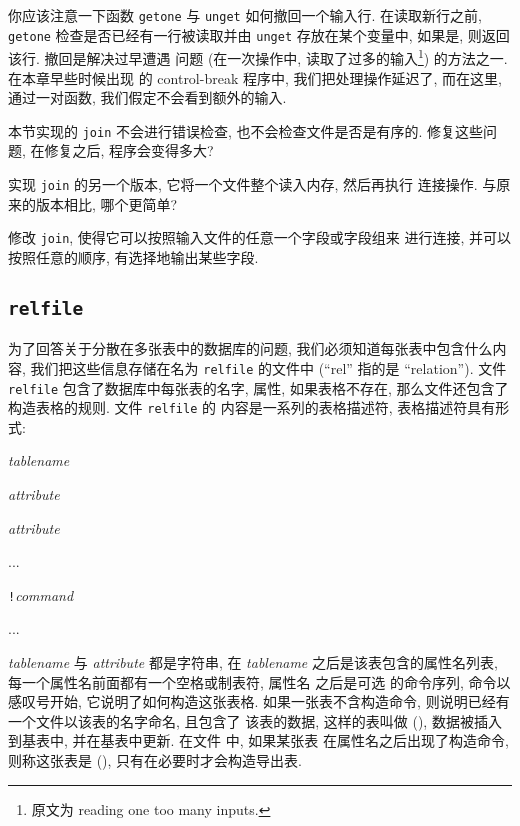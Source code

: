 你应该注意一下函数 \texttt{getone} 与 \texttt{unget} 如何撤回一个输入行.
在读取新行之前, \texttt{getone} 检查是否已经有一行被读取并由
\texttt{unget} 存放在某个变量中, 如果是, 则返回该行. 撤回是解决过早遭遇
问题 (在一次操作中, 读取了过多的输入\footnote{原文为 reading one too 
many inputs.}) 的方法之一.
在本章早些时候出现 的 control-break 程序中, 我们把处理操作延迟了, 而在这里,
通过一对函数, 我们假定不会看到额外的输入.

\begin{exercise}
    本节实现的 \texttt{join} 不会进行错误检查, 也不会检查文件是否是有序的.
    修复这些问题, 在修复之后, 程序会变得多大?
\end{exercise}

\begin{exercise}
    实现 \texttt{join} 的另一个版本, 它将一个文件整个读入内存, 然后再执行 
    连接操作. 与原来的版本相比, 哪个更简单?
\end{exercise}

\begin{exercise}
    修改 \texttt{join}, 使得它可以按照输入文件的任意一个字段或字段组来
    进行连接, 并可以按照任意的顺序, 有选择地输出某些字段.
\end{exercise}

\subsection{\texttt{relfile}}
为了回答关于分散在多张表中的数据库的问题, 我们必须知道每张表中包含什么内容,
我们把这些信息存储在名为 \texttt{relfile} 的文件中 (``rel'' 指的是
``relation''). 文件 \texttt{relfile} 包含了数据库中每张表的名字, 属性,
如果表格不存在, 那么文件还包含了构造表格的规则. 文件 \texttt{relfile} 的
内容是一系列的表格描述符, 表格描述符具有形式:
\begin{pattern}
    \indent\textit{tablename} \par 
    \indent\indent\textit{attribute} \par 
    \indent\indent\textit{attribute} \par 
    \indent\indent\indent ...   \par
    \indent\indent\texttt{!}\textit{command} \par
    \indent\indent\indent ...
\end{pattern}
\textit{tablename} 与 \textit{attribute} 都是字符串, 在 \textit{tablename} 
之后是该表包含的属性名列表, 每一个属性名前面都有一个空格或制表符, 属性名
之后是可选 的命令序列, 命令以感叹号开始, 它说明了如何构造这张表格.
如果一张表不含构造命令, 则说明已经有一个文件以该表的名字命名, 且包含了
该表的数据, 这样的表叫做  (), 数据被插入
到基表中, 并在基表中更新. 在文件  中, 如果某张表
在属性名之后出现了构造命令, 则称这张表是  (), 只有在必要时才会构造导出表.

